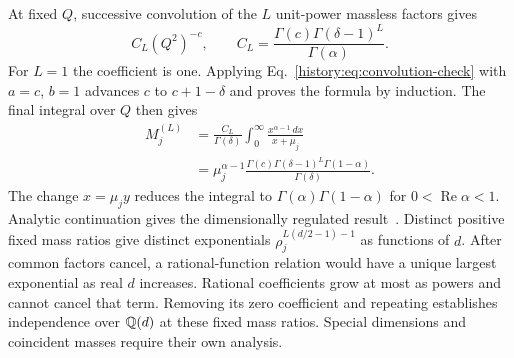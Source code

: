 At fixed $Q$, successive convolution of the $L$ unit-power massless factors gives
\begin{equation}
 C_L(Q^2)^{-c},\qquad
 C_L=\frac{\Gamma(c)\Gamma(\delta-1)^L}{\Gamma(\alpha)}.
\end{equation}
For $L=1$ the coefficient is one. Applying Eq.~\eqref{history:eq:convolution-check} with $a=c$, $b=1$ advances $c$ to $c+1-\delta$ and proves the formula by induction. The final integral over $Q$ then gives
\begin{align}
 M_j^{(L)}
 &=\frac{C_L}{\Gamma(\delta)}\int_0^\infty
       \frac{x^{\alpha-1}\,dx}{x+\mu_j}\nonumber\\
 &=\mu_j^{\alpha-1}
 \frac{\Gamma(c)\Gamma(\delta-1)^L\Gamma(1-\alpha)}{\Gamma(\delta)}.
 \label{history:eq:master-value-check}
\end{align}
The change $x=\mu_j y$ reduces the integral to
$\Gamma(\alpha)\Gamma(1-\alpha)$ for $0<\operatorname{Re}\alpha<1$. Analytic continuation gives the dimensionally regulated result~\cite{Weinzierl2022}. Distinct positive fixed mass ratios give distinct exponentials $\rho_j^{L(d/2-1)-1}$ as functions of $d$. After common factors cancel, a rational-function relation would have a unique largest exponential as real $d$ increases. Rational coefficients grow at most as powers and cannot cancel that term. Removing its zero coefficient and repeating establishes independence over $\mathbb Q(d)$ at these fixed mass ratios. Special dimensions and coincident masses require their own analysis.

